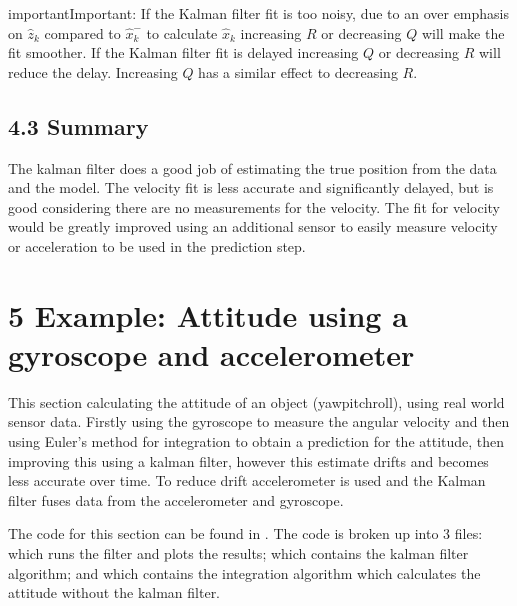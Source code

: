 \documentclass[letterpaper,10pt,english]{jupyterBook}
\begin{document}
\begin{sphinxadmonition}{important}{Important:}
\sphinxAtStartPar
If the Kalman filter fit is too noisy, due to an over emphasis on \(\hat{z}_k\) compared to \(\hat{x}^-_k\) to calculate \(\hat{x}_{k}\) increasing \(R\) or decreasing \(Q\) will make the fit smoother. If the Kalman filter fit is delayed increasing \(Q\) or decreasing \(R\) will reduce the delay. Increasing \(Q\) has a similar effect to decreasing \(R\).
\end{sphinxadmonition}


\section{4.3 Summary}
\label{\detokenize{4ExampleVelocityFromPosition:summary}}
\sphinxAtStartPar
The kalman filter does a good job of estimating the true position from the data and the model. The velocity fit is less accurate and significantly delayed, but is good considering there are no measurements for the velocity. The fit for velocity would be greatly improved using an additional sensor to easily measure velocity or acceleration to be used in the prediction step.

\sphinxstepscope


\chapter{5 Example: Attitude using a gyroscope and accelerometer}
\label{\detokenize{5IMU:example-attitude-using-a-gyroscope-and-accelerometer}}\label{\detokenize{5IMU::doc}}
\sphinxAtStartPar
This section calculating the attitude of an object (yaw\sphinxhyphen{}pitch\sphinxhyphen{}roll), using real world sensor data. Firstly using the gyroscope to measure the angular velocity and then using Euler’s method for integration to obtain a prediction for the attitude, then improving this using a kalman filter, however this estimate drifts and becomes less accurate over time. To reduce drift accelerometer is used and the Kalman filter fuses data from the accelerometer and gyroscope.

\sphinxAtStartPar
The code for this section can be found in . The code is broken up into 3 files:  which runs the filter and plots the results;  which contains the kalman filter algorithm; and  which contains the integration algorithm which calculates the attitude without the kalman filter.
\end{document}
